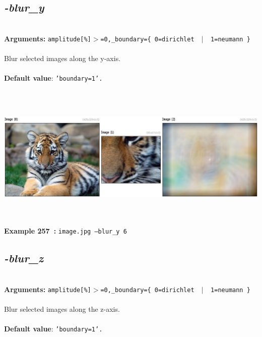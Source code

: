 \documentclass[a4paper,11pt,twoside]{book}
\begin{document}
\subsection{\emph{-blur\_y} }\vspace*{-0.5em}
~\\\textbf{Arguments: } 
{\small \texttt{amplitude[\%]$>$=0,\_boundary=\{ 0=dirichlet ~$|$~ 1=neumann \}}}\\~\\
Blur selected images along the y-axis.
~\\~\\\textbf{Default value}: {\small \texttt{'boundary=1'.}}
\begin{center}\includegraphics[keepaspectratio=true,height=7cm,width=\textwidth]{img/gmic_def257.jpg}\\
{\footnotesize \textbf{Example 257~:} \texttt{image.jpg --blur\_y 6}}
\end{center}

\subsection{\emph{-blur\_z} }\vspace*{-0.5em}
~\\\textbf{Arguments: } 
{\small \texttt{amplitude[\%]$>$=0,\_boundary=\{ 0=dirichlet ~$|$~ 1=neumann \}}}\\~\\
Blur selected images along the z-axis.
~\\~\\\textbf{Default value}: {\small \texttt{'boundary=1'.}}
\end{document}
